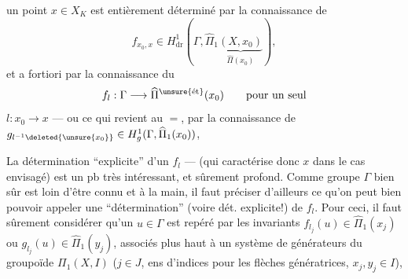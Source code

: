 un point $x\in X_K$ est entièrement déterminé par la connaissance de 
\[
f_{x_0,x}\in H^1_{\mathrm{dr}}(\Gamma,\widehat\Pi_1\underbrace{(X,x_0)}_{\widehat\Pi(x_0)}),
\]
et a fortiori par la connaissance du 
\[
f_l:\Gamma\longrightarrow\widehat\Pi^{\unsure{\text{ét}}}(x_0)\qquad\text{pour un seul}
\]
$l:x_0\longrightarrow x$ --- ou ce qui revient au $=$, par la connaissance de $g_{l^{-1}\deleted{\unsure{x_0}}}\in H^1_g(\Gamma,\widehat\Pi_1(x_0))$, 

 La détermination ``explicite'' d'un $f_l$ ---  (qui caractérise donc $x$ dans le cas envisagé) est un pb très intéressant, et sûrement profond. Comme   groupe $\Gamma$ bien sûr est loin d'être connu et à la main, il faut préciser d'ailleurs ce qu'on peut bien pouvoir appeler une ``détermination'' (voire dét. explicite!) de $f_l$. Pour ceci, il faut sûrement considérer qu'un $u\in\Gamma$ est repéré par les invariants $f_{l_j}(u)\in\widehat\Pi_1(x_j)$ ou $g_{l_j}(u)\in\widehat\Pi_1(y_j)$, associés plus haut à un système  de générateurs  du groupoïde $\Pi_1(X,I)$ ($j\in J$, ens d'indices pour les flèches génératrices, $x_j,y_j\in I$),
